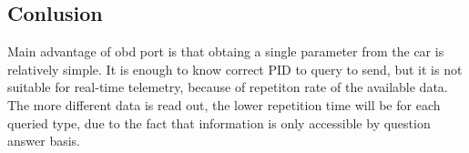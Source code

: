 \subsection{Conlusion} %
\label{sub:conlusion}
Main advantage of \gls{obd} port is that obtaing a single parameter from the car is relatively simple. It is enough to know correct PID to query to send, but it is not suitable for real-time telemetry, because of repetiton rate of the available data. The more different data is read out, the lower repetition time will be for each queried type, due to the fact that information is only accessible by question answer basis.
